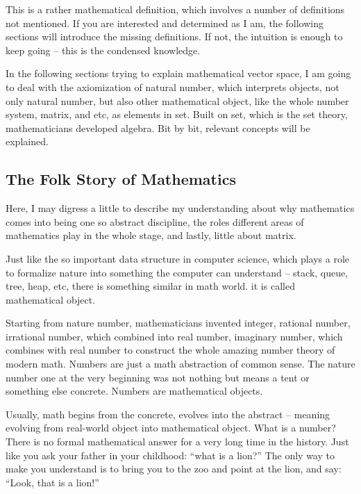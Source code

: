 \documentclass[a4paper]{book}
\begin{document}
  This is a rather mathematical definition, which involves a number
  of definitions not mentioned. If you are interested and determined
  as I am, the following sections will introduce the missing
  definitions. If not, the intuition is enough to keep going -- this
  is the condensed knowledge.

  In the following sections trying to explain mathematical vector
  space, I am going to deal with the axiomization of natural number,
  which interprets objects, not only natural number, but also other
  mathematical object, like the whole number system, matrix, and
  etc, as elements in set. Built on set, which is the set theory,
  mathematicians developed algebra. Bit by bit, relevant concepts
  will be explained.

    \subsection{The Folk Story of Mathematics}
    \label{subsec:The Folk Story of Mathematics}

    Here, I may digress a little to describe my understanding about why
    mathematics comes into being one so abstract discipline, the roles
    different areas of mathematics play in the whole stage, and lastly,
    little about matrix.

    Just like the so important data structure in computer science,
    which plays a role to formalize nature into something the computer
    can understand -- stack, queue, tree, heap, etc, there is
    something similar in math world. it is called mathematical object.

    Starting from nature number, mathematicians invented integer,
    rational number, irrational number, which combined into real number,
    imaginary number, which combines with real number to construct the
    whole amazing number theory of modern math. Numbers are just a
    math abstraction of common sense. The nature number one at the
    very beginning was not nothing but means a tent or something else
    concrete. Numbers are mathematical objects.

    Usually, math begins from the concrete, evolves into the abstract
    -- meaning evolving from real-world object into mathematical
    object.  What is a number? There is no formal mathematical answer
    for a very long time in the history. Just like you ask your father
    in your childhood: ``what is a lion?'' The only way to make you
    understand is to bring you to the zoo and point at the lion, and
    say: ``Look, that is a lion!''
    
\end{document}
